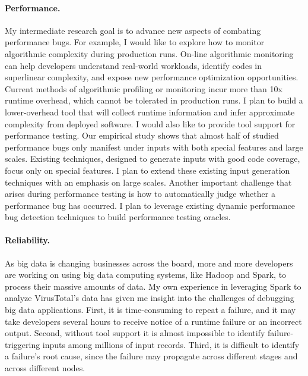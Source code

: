 \documentclass[10pt]{article}
\begin{document}
\paragraph{Performance.} 
My intermediate research goal is to advance new aspects of combating performance bugs.
For example, I would like to explore how to monitor algorithmic complexity during production runs. 
On-line algorithmic monitoring can help developers understand real-world workloads, 
identify codes in superlinear complexity, 
and expose new performance optimization opportunities. 
Current methods of algorithmic profiling or monitoring incur more than 10x runtime overhead, which cannot be tolerated in production runs. 
I plan to build a lower-overhead tool that will collect runtime information 
and infer approximate complexity from deployed software. 
I would also like to provide tool support for performance testing.
Our empirical study shows that almost half of studied performance bugs only manifest 
under inputs with both special features and large scales.
Existing techniques, designed to generate inputs with good code coverage, focus only on special features.
I plan to extend these existing input generation techniques with an emphasis on large scales. 
Another important challenge that arises during performance testing is how to automatically judge whether a performance bug has occurred. 
I plan to leverage existing dynamic performance bug detection techniques to build performance testing oracles.

\vspace{-.1in}
\paragraph{Reliability.} 
As big data is changing businesses across the board, 
more and more developers are working on using big data computing systems, 
like Hadoop and Spark, to process their massive amounts of data. 
My own experience in leveraging Spark to analyze VirusTotal's data 
has given me insight into the challenges of debugging big data applications. 
First, it is time-consuming to repeat a failure, and it may take developers several hours to receive notice of a runtime failure or an incorrect output.
Second, without tool support it is almost impossible to identify failure-triggering inputs among millions of input records. 
Third, it is difficult to identify a failure's root cause, 
since the failure may propagate across different stages and across different nodes.
\end{document}
